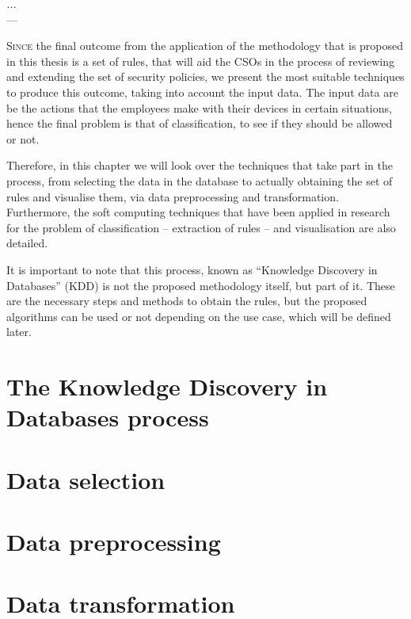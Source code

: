 \label{chap:softc} 

\begin{flushright}{\slshape
    ...} \\ \medskip
    --- {}
\end{flushright}

\minitoc\mtcskip
\vfill

\lettrine{S}{ince} the final outcome from the application of the methodology that is proposed in this thesis is a set of rules, that will aid the CSOs in the process of reviewing and extending the set of security policies, we present the most suitable techniques to produce this outcome, taking into account the input data. The input data are be the actions that the employees make with their devices in certain situations, hence the final problem is that of classification, to see if they should be allowed or not.

Therefore, in this chapter we will look over the techniques that take part in the process, from selecting the data in the database to actually obtaining the set of rules and visualise them, via data preprocessing and transformation. Furthermore, the soft computing techniques that have been applied in research for the problem of classification -- extraction of rules -- and visualisation are also detailed.

It is important to note that this process, known as ``Knowledge Discovery in Databases'' (KDD) is not the proposed methodology itself, but part of it. These are the necessary steps and methods to obtain the rules, but the proposed algorithms can be used or not depending on the use case, which will be defined later.

\section{The Knowledge Discovery in Databases process}

\cite{fayyad1996data}

\section{Data selection}

\section{Data preprocessing}

\section{Data transformation}

